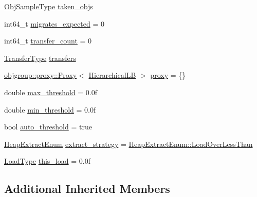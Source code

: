 \begin{DoxyCompactItemize}
\item 
\hyperlink{structvt_1_1vrt_1_1collection_1_1lb_1_1_load_sampler_base_l_b_a8d939a849ec0d6371c1c4d441ffb9b94}{Obj\+Sample\+Type} \hyperlink{structvt_1_1vrt_1_1collection_1_1lb_1_1_hierarchical_l_b_a72831d31662a79dcb0cf5e1f9f2499dc}{taken\+\_\+objs}
\item 
int64\+\_\+t \hyperlink{structvt_1_1vrt_1_1collection_1_1lb_1_1_hierarchical_l_b_a79229451e82b523ca25e81c8249cc048}{migrates\+\_\+expected} = 0
\item 
int64\+\_\+t \hyperlink{structvt_1_1vrt_1_1collection_1_1lb_1_1_hierarchical_l_b_a858f07d19923904e7a8bb4a93c96041c}{transfer\+\_\+count} = 0
\item 
\hyperlink{structvt_1_1vrt_1_1collection_1_1lb_1_1_base_l_b_a0a5f834082d85c558bdaf84c464c1ead}{Transfer\+Type} \hyperlink{structvt_1_1vrt_1_1collection_1_1lb_1_1_hierarchical_l_b_ab9aad1307a83953ea436e1e3d865bbd0}{transfers}
\item 
\hyperlink{structvt_1_1objgroup_1_1proxy_1_1_proxy}{objgroup\+::proxy\+::\+Proxy}$<$ \hyperlink{structvt_1_1vrt_1_1collection_1_1lb_1_1_hierarchical_l_b}{Hierarchical\+LB} $>$ \hyperlink{structvt_1_1vrt_1_1collection_1_1lb_1_1_hierarchical_l_b_a116c56497faa79eff02d0f4b9932eba5}{proxy} = \{\}
\item 
double \hyperlink{structvt_1_1vrt_1_1collection_1_1lb_1_1_hierarchical_l_b_a14170b4d5e34cb45fd9e3ba08f6886cb}{max\+\_\+threshold} = 0.\+0f
\item 
double \hyperlink{structvt_1_1vrt_1_1collection_1_1lb_1_1_hierarchical_l_b_ab7ef9cc6d966759b3634d04427cab1b5}{min\+\_\+threshold} = 0.\+0f
\item 
bool \hyperlink{structvt_1_1vrt_1_1collection_1_1lb_1_1_hierarchical_l_b_a4f1e749384f8ae015ed1aabaa1b9a732}{auto\+\_\+threshold} = true
\item 
\hyperlink{namespacevt_1_1vrt_1_1collection_1_1lb_aeb0f47cf4b89bed7ea05462d0c2e5b5e}{Heap\+Extract\+Enum} \hyperlink{structvt_1_1vrt_1_1collection_1_1lb_1_1_hierarchical_l_b_a3bbe0e2597f6c01024f058d20ae9d26e}{extract\+\_\+strategy} = \hyperlink{namespacevt_1_1vrt_1_1collection_1_1lb_aeb0f47cf4b89bed7ea05462d0c2e5b5ea41a33133c182e43b9dfc2599f39eaa94}{Heap\+Extract\+Enum\+::\+Load\+Over\+Less\+Than}
\item 
\hyperlink{namespacevt_a8fb51741340b87d7aaee0bef60e9896b}{Load\+Type} \hyperlink{structvt_1_1vrt_1_1collection_1_1lb_1_1_hierarchical_l_b_a5e1f0fa5a3806c5e02a5baf334c7fc37}{this\+\_\+load} = 0.\+0f
\end{DoxyCompactItemize}
\subsection*{Additional Inherited Members}


